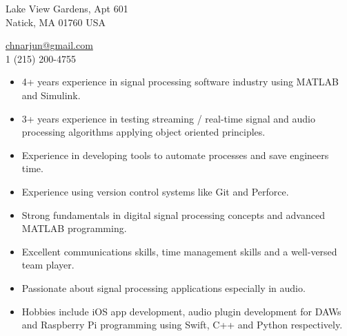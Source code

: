 \documentclass[12pt,a4paper]{article} %
\begin{document}
 


\begin{multicols}{2}

\begin{flushright}
 Lake View Gardens, Apt 601\\ Natick, MA 01760 USA %

\noindent\href{mailto:chnarjun@gmail.com}{chnarjun@gmail.com}\\%
\textsmaller{+}1 (215) 200-4755
\end{flushright}
\end{multicols}
\spacedhrule{0.9em}{-0.4em} %




\begin{itemize}
\item 4+ years experience in signal processing software industry using MATLAB and Simulink.
\noindent\item 3+ years experience in testing streaming / real-time signal and audio processing algorithms applying object oriented principles.
\noindent\item Experience in developing tools to automate processes and save engineers time.
\noindent\item Experience using version control systems like Git and Perforce.
\noindent\item Strong fundamentals in digital signal processing concepts and advanced MATLAB programming.
\noindent\item Excellent communications skills, time management skills and a well-versed team player.
\noindent\item Passionate about signal processing applications especially in audio.
\noindent\item Hobbies include iOS app development, audio plugin development for DAWs and Raspberry Pi programming using Swift, C++ and Python respectively.

\end{itemize}
\end{document}
